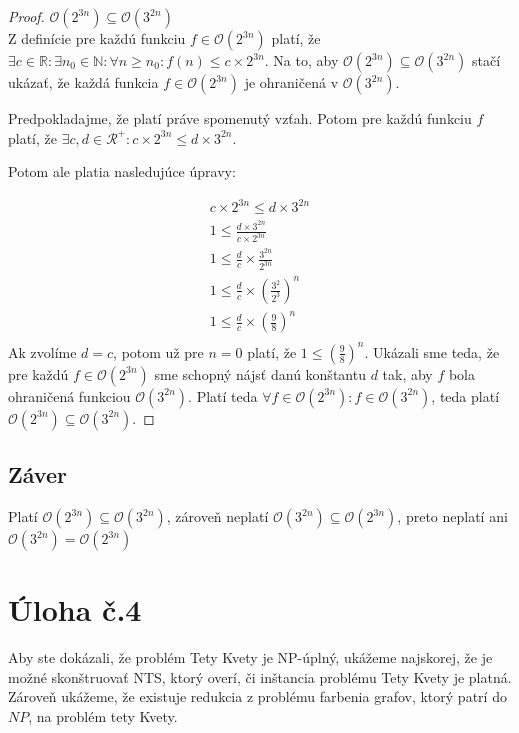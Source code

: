 \documentclass[10pt]{article}
\begin{document}
\begin{proof}
$\mathcal{O}(2^{3n}) \subseteq \mathcal{O}(3^{2n})$ \\
Z definície pre každú funkciu $f \in \mathcal{O}(2^{3n})$ platí, že $\exists c \in \mathbb{R}: \exists n_0 \in \mathbb{N}: \forall n \geq n_0: f(n) \leq c\times 2^{3n}$.  
Na to, aby $\mathcal{O}(2^{3n}) \subseteq \mathcal{O}(3^{2n})$ stačí ukázať, že každá funkcia $f \in \mathcal{O}(2^{3n})$ je ohraničená v $\mathcal{O}(3^{2n})$.

Predpokladajme, že platí práve spomenutý vzťah. Potom pre každú funkciu $f$ platí, že $\exists c,d \in \mathcal{R}^+: c \times 2^{3n} \leq d \times 3^{2n}$. 

Potom ale platia nasledujúce úpravy:

\begin{align*}
    c \times 2^{3n} \leq d \times 3^{2n}  \\
    1 \leq \frac{d \times 3^{2n}}{c \times 2^{3n}} \\
    1 \leq \frac{d}{c} \times \frac{3^{2n}}{2^{3n}} \\
    1 \leq \frac{d}{c} \times (\frac{3^{2}}{2^{3}})^n \\
    1 \leq \frac{d}{c} \times (\frac{9}{8})^n \\
\end{align*}
Ak zvolíme $d = c$, potom už pre $n = 0$ platí, že $1 \leq (\frac{9}{8})^n$.
Ukázali sme teda, že pre každú $f \in \mathcal{O}(2^{3n})$ sme schopný nájsť danú konštantu $d$ tak, aby $f$ bola ohraničená funkciou $\mathcal{O}(3^{2n})$.
Platí teda $\forall f \in \mathcal{O}(2^{3n}): f \in \mathcal{O}(3^{2n})$, teda platí $\mathcal{O}(2^{3n}) \subseteq \mathcal{O}(3^{2n})$. 
\end{proof}

\subsection*{Záver}
Platí $\mathcal{O}(2^{3n}) \subseteq \mathcal{O}(3^{2n})$, zároveň neplatí $\mathcal{O}(3^{2n}) \subseteq \mathcal{O}(2^{3n})$, preto neplatí ani $\mathcal{O}(3^{2n}) = \mathcal{O}(2^{3n})$


\section*{Úloha č.4}
Aby ste dokázali, že problém Tety Kvety je NP-úplný, ukážeme najskorej, že je možné skonštruovať NTS, ktorý overí, či inštancia problému Tety Kvety je platná. Zároveň ukážeme, že existuje redukcia z problému farbenia grafov, ktorý patrí do $NP$, na problém tety Kvety.
\end{document}
